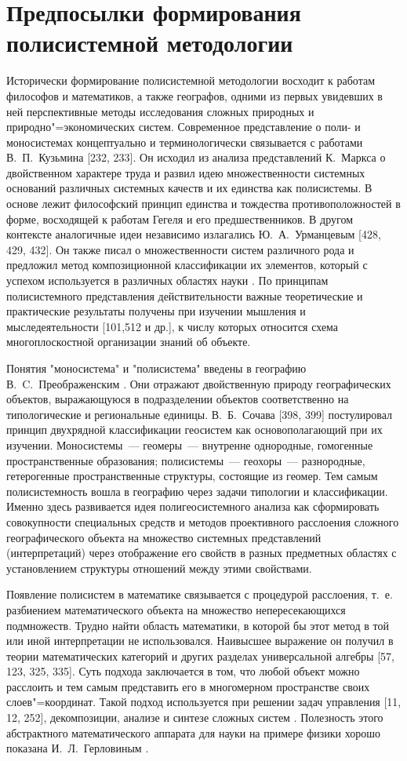 \documentclass[draft,openany,14pt]{extbook}
\begin{document}
\section{Предпосылки формирования полисистемной методологии}

Исторически формирование полисистемной методологии восходит к работам философов и математиков, а также географов, одними из первых увидевших в ней перспективные методы исследования сложных природных и природно"=экономических систем. Современное представление о поли- и моносистемах концептуально и терминологически связывается с работами В.~П.~Кузьмина [232, 233]. Он исходил из анализа представлений К.~Маркса о двойственном характере труда и развил идею множественности системных оснований различных системных качеств и их единства как полисистемы. В основе лежит философский принцип единства и тождества противоположностей в форме, восходящей к работам Гегеля и его предшественников. В другом контексте аналогичные идеи независимо излагались Ю.~А.~Урманцевым [428, 429, 432]. Он также писал о множественности систем различного рода и предложил метод композиционной классификации их элементов, который с успехом используется в различных областях науки \cite{b381}. По принципам полисистемного представления действительности важные теоретические и практические результаты получены при изучении мышления и мыследеятельности [101,512 и др.], к числу которых относится схема многоплоскостной организации знаний об объекте.

Понятия "моносистема" и "полисистема" введены в географию В.~C.~Преображенским \cite{b338}. Они отражают двойственную природу географических объектов, выражающуюся в подразделении объектов соответственно на типологические и региональные единицы.  В.~Б.~Сочава [398, 399] постулировал принцип двухрядной классификации геосистем как основополагающий при их изучении. Моносистемы~--- геомеры~--- внутренне однородные, гомогенные пространственные образования; полисистемы~--- геохоры~--- разнородные, гетерогенные пространственные структуры, состоящие из геомер. Тем самым полисистемность вошла в географию через задачи типологии и классификации. Именно здесь развивается идея полигеосистемного анализа как сформировать совокупности специальных средств и методов проективного расслоения сложного географического объекта на множество системных представлений (интерпретаций) через отображение его свойств в разных предметных областях с установлением структуры отношений между этими свойствами.

Появление полисистем в математике связывается с процедурой расслоения, т.~е. разбиением математического объекта на множество непересекающихся подмножеств. Трудно найти область математики, в которой бы этот метод в той или иной интерпретации не использовался. Наивысшее выражение он получил в теории математических категорий и других разделах универсальной алгебры [57, 123, 325, 335]. Суть подхода заключается в том, что любой объект можно расслоить и тем самым представить его в многомерном пространстве своих слоев"=координат. Такой подход используется при решении задач управления [11, 12, 252], декомпозиции, анализе и синтезе сложных систем \cite{b391}. Полезность этого абстрактного математического аппарата для науки на примере физики хорошо показана И.~Л.~Герловиным \cite{b104}.
\end{document}
